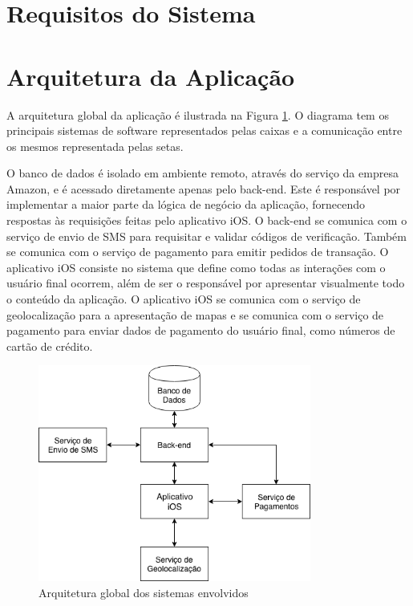 \section{Requisitos do Sistema}


\section{Arquitetura da Aplicação}
A arquitetura global da aplicação é ilustrada na Figura \ref{fig:architecture}. O diagrama tem os principais sistemas de software representados pelas caixas e a comunicação entre os mesmos representada pelas setas. 

O banco de dados é isolado em ambiente remoto, através do serviço da empresa Amazon, e é acessado diretamente apenas pelo back-end. Este é responsável por implementar a maior parte da lógica de negócio da aplicação, fornecendo respostas às requisições feitas pelo aplicativo iOS. O back-end se comunica com o serviço de envio de SMS para requisitar e validar códigos de verificação. Também se comunica com o serviço de pagamento para emitir pedidos de transação. O aplicativo iOS consiste no sistema que define como todas as interações com o usuário final ocorrem, além de ser o responsável por apresentar visualmente todo o conteúdo da aplicação. O aplicativo iOS se comunica com o serviço de geolocalização para a apresentação de mapas e se comunica com o serviço de pagamento para enviar dados de pagamento do usuário final, como números de cartão de crédito.

\begin{figure}[H]
    \centering
    \includegraphics[width=0.8\textwidth]{pfc/figuras/system-architecture.png}
    \caption{Arquitetura global dos sistemas envolvidos}
    \label{fig:architecture}
\end{figure}
